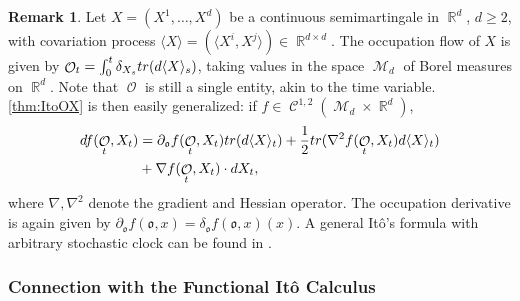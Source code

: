 \documentclass[11pt]{article}
\def\mo{\mathfrak{o}}
\theoremstyle{plain}
\theoremstyle{definition}
\newtheorem{remark}{Remark}
\DeclareMathOperator{\R}{\mathbb{R}}
\DeclareMathOperator{\calC}{\mathcal{C}}
\DeclareMathOperator{\calM}{\mathcal{M}}
\DeclareMathOperator{\calO}{\mathcal{O}}
\begin{document}
\begin{remark}\label{rem:multiD}
    Let $X = (X^1,\ldots,X^d)$ be a continuous semimartingale in $\R^d$, $d\ge 2$, with covariation process $\langle X \rangle = (\langle X^i,X^j \rangle)\in \R^{d\times d}.$ The occupation flow of $X$  is given  by  
    $\calO_t = \int_0^t \delta_{X_s}\textnormal{tr}(d\langle X \rangle_s)$, taking values in the space  $\calM_d$ of  Borel measures on $\R^d$.  Note that $\calO$ is still a single entity,  akin to  the  time variable. 
    \cref{thm:ItoOX} is then easily generalized: if $f\in \calC^{1,2}(\calM_d\times \R^d)$,  
      \begin{align*}
        df(\calO_t,X_t) &=  \partial_{\mo} f(\calO_t,X_t) \textnormal{tr}(d\langle X \rangle_t)  +   \frac{1}{2} \textnormal{tr}(\nabla^2 f(\calO_t,X_t) d\langle X \rangle_t) \\
        &+ \nabla f(\calO_t,X_t) \cdot  dX_t,\label{eq:itoGeneralmultiD}
    \end{align*}
    where $\nabla, \nabla^2$ denote  the gradient and Hessian operator. 
    The occupation derivative 
    is again given by $\partial_{\mo} f(\mo,x) = \delta_{\mo}f(\mo,x)(x)$. 
    A general It\^o's formula with arbitrary stochastic clock can be found in \cite[Proposition 3.3]{SonerTissotZhang}. 
\end{remark}

  \subsubsection{Connection with the Functional It\^o Calculus}\label{sec:FITO} 
  
\end{document}

